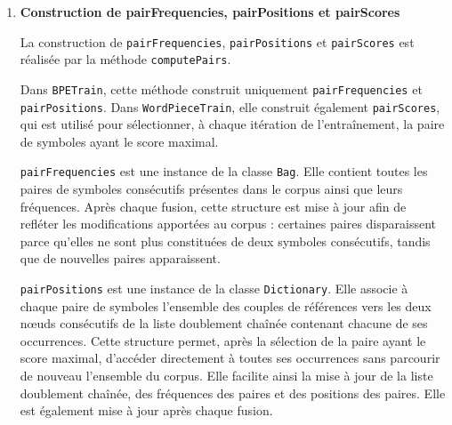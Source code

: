 \documentclass[12pt,a4paper]{report}
\begin{document}
\begin{enumerate}
	La méthode \texttt{addToTokenFrequenciesAndTokenPositions:} est implémentée comme suit :
	
	\begin{verbatim}
		addToTokenFrequenciesAndTokenPositions: aToken
				tokenFrequencies
				add: aToken token
				withOccurrences: aToken occurence .
				tokenPositions
				at: aToken token
				update: [:set|
						set add: aToken position ;
						yourself ]
				initial: (Set with: aToken position)
	\end{verbatim}
	
	La méthode \texttt{computeVocabulary} est quant à elle implémentée de la manière suivante :
	
	\begin{verbatim}
		computeVocabulary
				|i|
				i:=corpus firstLink .
				[ i notNil ]
				whileTrue: [
						[ i value class ~= EndOfWord ]
						whileTrue: [
								self addToTokenFrequenciesAndTokenPositions: (i value ).
								i:= i nextLink].
						i:= i nextLink].
				vocabulary := tokenFrequencies asSet .
	\end{verbatim}
	
	\item \textbf{Construction de pairFrequencies, pairPositions et pairScores}
	
	La construction de \texttt{pairFrequencies}, \texttt{pairPositions} et \texttt{pairScores} est réalisée par la méthode \texttt{computePairs}.
	
	Dans \texttt{BPETrain}, cette méthode construit uniquement \texttt{pairFrequencies} et \texttt{pairPositions}. Dans \texttt{WordPieceTrain}, elle construit également \texttt{pairScores}, qui est utilisé pour sélectionner, à chaque itération de l'entraînement, la paire de symboles ayant le score maximal.
	
	\texttt{pairFrequencies} est une instance de la classe \texttt{Bag}. Elle contient toutes les paires de symboles consécutifs présentes dans le corpus ainsi que leurs fréquences. Après chaque fusion, cette structure est mise à jour afin de refléter les modifications apportées au corpus : certaines paires disparaissent parce qu'elles ne sont plus constituées de deux symboles consécutifs, tandis que de nouvelles paires apparaissent.
	
	\texttt{pairPositions} est une instance de la classe \texttt{Dictionary}. Elle associe à chaque paire de symboles l'ensemble des couples de références vers les deux nœuds consécutifs de la liste doublement chaînée contenant chacune de ses occurrences. Cette structure permet, après la sélection de la paire ayant le score maximal, d'accéder directement à toutes ses occurrences sans parcourir de nouveau l'ensemble du corpus. Elle facilite ainsi la mise à jour de la liste doublement chaînée, des fréquences des paires et des positions des paires. Elle est également mise à jour après chaque fusion.
	

\end{enumerate}
\end{document}

